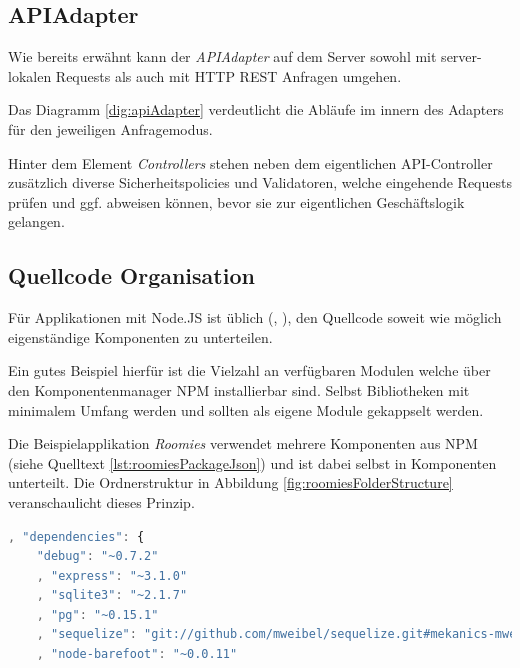 


\subsection{APIAdapter}
Wie bereits erwähnt kann der \emph{APIAdapter} auf dem Server sowohl mit server-lokalen Requests als auch mit HTTP REST Anfragen umgehen.

Das Diagramm \ref{dig:apiAdapter} verdeutlicht die Abläufe im innern des Adapters für den jeweiligen Anfragemodus.

Hinter dem Element \emph{Controllers} stehen neben dem eigentlichen API-Controller zusätzlich diverse Sicherheitspolicies und Validatoren, welche eingehende Requests prüfen und ggf. abweisen können, bevor sie zur eigentlichen Geschäftslogik gelangen.




\subsection{Quellcode Organisation}
Für Applikationen mit Node.JS ist üblich (\cite{TJH_ComponentStructure}, \cite{IZS_ComponentStructure}), den Quellcode soweit wie möglich eigenständige Komponenten zu unterteilen.

Ein gutes Beispiel hierfür ist die Vielzahl an verfügbaren Modulen welche über den Komponentenmanager NPM \cite{NPM} installierbar sind. Selbst Bibliotheken mit minimalem Umfang werden und sollten als eigene Module gekappselt werden.

Die Beispielapplikation \emph{Roomies} verwendet mehrere Komponenten aus NPM (siehe Quelltext \ref{lst:roomiesPackageJson}) und ist dabei selbst in Komponenten unterteilt. Die Ordnerstruktur in Abbildung \ref{fig:roomiesFolderStructure} veranschaulicht dieses Prinzip.

\begin{lstlisting}[language=JavaScript, firstnumber=9, caption={Auszug der verwendeten NPM Komponenten \cite{RoomiesPackageJson}}, label={lst:roomiesPackageJson}, float=ht!]
, "dependencies": {
	"debug": "~0.7.2"
	, "express": "~3.1.0"
	, "sqlite3": "~2.1.7"
	, "pg": "~0.15.1"
	, "sequelize": "git://github.com/mweibel/sequelize.git#mekanics-mweibel-fix"
	, "node-barefoot": "~0.0.11"
\end{lstlisting}


